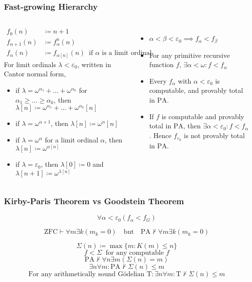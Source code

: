 \documentclass[UTF8,aspectratio=43,11pt,colorlinks,compress,openany]{beamer}%
\begin{document}
\begin{frame}\frametitle{Fast-growing Hierarchy}
\setlength\abovedisplayskip{0pt}
	\begin{columns}[onlytextwidth]
			\begin{definition}
				\begin{align*}
				f_{0}(n)&\coloneqq n+1\\
				f_{{\alpha +1}}(n)&\coloneqq f_{\alpha }^{n}(n)\\
				f_{\alpha }(n)&\coloneqq f_{{\alpha [n]}}(n)\;\;\text{if $\alpha$ is a limit ordinal.}
				\end{align*}
				For limit ordinals $\lambda<\varepsilon_0$, written in Cantor normal form,
				\begin{itemize}
					\item if $\lambda=\omega^{\alpha_1}+\dots+\omega^{\alpha_k}$ for $\alpha_1\geq\dots\geq\alpha_k$, then $\lambda[n]\coloneqq \omega^{\alpha_1}+\dots+\omega^{\alpha_k}[n]$
					\item if $\lambda=\omega^{\alpha+1}$, then $\lambda[n]\coloneqq \omega^\alpha[n]$
					\item if $\lambda=\omega^\alpha$ for a limit ordinal $\alpha$, then $\lambda[n]\coloneqq \omega^{\alpha[n]}$
					\item if $\lambda=\varepsilon_0$, then $\lambda[0]\coloneqq 0$ and $\lambda[n+1]\coloneqq \omega^{\lambda[n]}$
				\end{itemize}
			\end{definition}
			\begin{itemize}
				\item $\alpha<\beta<\varepsilon_0\implies f_\alpha<f_\beta$
				\item For any primitive recursive function $f$, $\exists\alpha<\omega: f<f_\alpha$
				\item Every $f_\alpha$ with $\alpha<\varepsilon_0$ is computable, and provably total in $\mathrm{PA} $.
				\item If $f$ is computable and provably total in $\mathrm{PA} $, then $\exists\alpha<\varepsilon_0: f<f_\alpha$. Hence $f_{\varepsilon_0}$ is not provably total in $\mathrm{PA} $.
			\end{itemize}
	\end{columns}
\end{frame}

\begin{frame}\frametitle{Kirby-Paris Theorem vs Goodstein Theorem}
	\begin{theorem}
		\[\forall \alpha<\varepsilon_0\left(f_\alpha<f_G\right)\]
	\end{theorem}
	\begin{block}{}
		\[\mathrm{ZFC}\vdash\forall m\exists k(m_k=0)\quad
		\text{but}\quad \mathrm{PA} \nvdash\forall m\exists k(m_k=0)\]
	\end{block}
	\[\Sigma(n)\coloneqq \max\{m: K(m)\leq n\}\]
	\[f<\Sigma\;\;\text{for any computable $f$}\]
	\[\mathrm{PA} \nvdash\forall n\exists m(\Sigma(n)=m)\]
	\[\exists n\forall m: \mathrm{PA} \nvdash\Sigma(n)\leq m\]
	\[\text{For any arithmetically sound G\"odelian $\mathrm{T}$}: \exists n\forall m: \mathrm{T}\nvdash\Sigma(n)\leq m\]
\end{frame}
\end{document}
